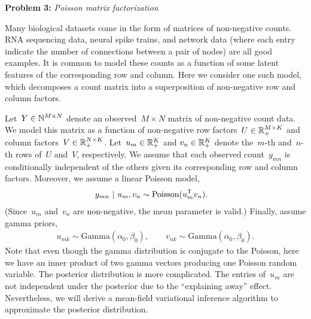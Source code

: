 
\textbf{Problem 3:} \textit{Poisson matrix factorization}

Many biological datasets come in the form of matrices of non-negative counts.  RNA sequencing data, neural spike trains, and network data (where each entry indicate the number of connections between a pair of nodes) are all good examples.  It is common to model these counts as a function of some latent features of the corresponding row and column.  Here we consider one such model, which decomposes a count matrix into a superposition of non-negative row and column factors. 

Let~$Y \in \mathbb{N}^{M \times N}$ denote an observed~$M \times N$ matrix of non-negative count data.  We model this matrix as a function of non-negative row factors~$U \in \mathbb{R}_+^{M \times K}$ and column factors~$V \in \mathbb{R}_+^{N \times K}$.  Let~$u_m \in \mathbb{R}_+^K$ and $v_n \in \mathbb{R}_+^K$ denote the~$m$-th and~$n$-th rows of~$U$ and~$V$, respectively.  We assume that each observed count~$y_{mn}$ is conditionally independent of the others given its corresponding row and column factors. Moreover, we assume a linear Poisson model,
\begin{align*}
    y_{mn} ~\vert~ u_m, v_n &\sim \mathrm{Poisson}(u_m^{\mathsf{T}} v_n).
\end{align*}
(Since~$u_m$ and~$v_n$ are non-negative, the mean parameter is valid.)  Finally, assume gamma priors,
\begin{align*}
    u_{mk} \sim \mathrm{Gamma}(\alpha_0, \beta_0), \qquad
    v_{nk} \sim \mathrm{Gamma}(\alpha_0, \beta_0).
\end{align*}
Note that even though the gamma distribution is conjugate to the Poisson, here we have an inner product of two gamma vectors producing one Poisson random variable.  The posterior distribution is more complicated.  The entries of~$u_m$ are not independent under the posterior due to the ``explaining away'' effect.  Nevertheless, we will derive a mean-field variational inference algorithm to approximate the posterior distribution.  

